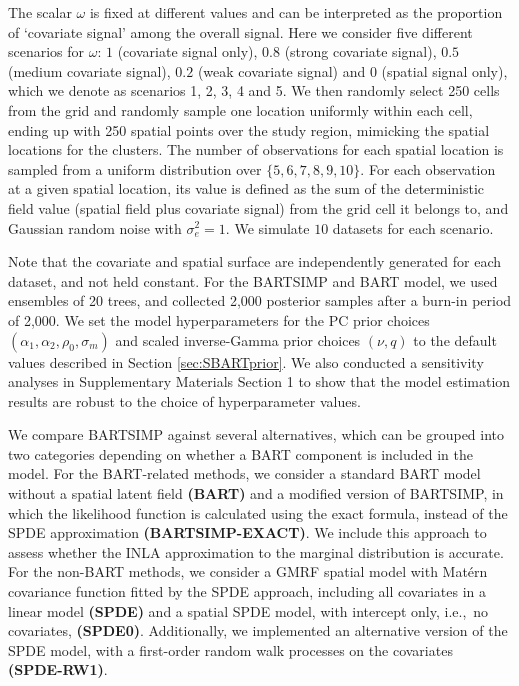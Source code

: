 \documentclass[preprint,12pt,authoryear]{elsarticle}
\begin{document}
{{}
The scalar $\omega$ is fixed at different values and can be interpreted as the proportion of `covariate signal' among the overall signal. Here we consider five different scenarios for $\omega$: $1$ (covariate signal only), $0.8$ (strong covariate signal), $0.5$ (medium covariate signal), $0.2$ (weak covariate signal) and $0$ (spatial signal only), which we denote as scenarios 1, 2, 3, 4 and 5. We then randomly select 250 cells from the grid and randomly sample one location uniformly within each cell, ending up with 250 spatial points over the study region, mimicking the spatial locations for the clusters. The number of observations for each spatial location is sampled from a uniform distribution over $\{5,6,7,8,9,10\}$. For each observation at a given spatial location, its value is defined as the sum of the deterministic field value (spatial field plus covariate signal)  from the grid cell it belongs to, and Gaussian random noise with $\sigma_e^2 = 1$. We simulate $10$ datasets for each scenario. {Note that the covariate and spatial surface are independently generated for each dataset, and not held constant. For the BARTSIMP and BART model, we used {ensembles of 20 trees, and collected 2,000 posterior samples after a burn-in period of 2,000.}  We set the model hyperparameters for the PC prior choices $(\alpha_1, \alpha_2, \rho_0, \sigma_m)$ and scaled inverse-Gamma prior choices $(\nu, q)$ to the default values described in Section \ref{sec:SBARTprior}. We also conducted a sensitivity analyses in Supplementary Materials Section 1 to show that the model estimation results are robust to the choice of hyperparameter values.

We compare BARTSIMP against several alternatives, which can be grouped into two categories depending on whether a BART component is included in the model. For the BART-related methods, we consider a standard BART model without a spatial latent field \textbf{(BART)} and a modified version of BARTSIMP, in which the likelihood function is calculated using the exact formula, instead of the SPDE approximation \textbf{(BARTSIMP-EXACT)}. We include this approach to assess whether the INLA approximation to the marginal distribution is accurate. For the non-BART methods, we consider a GMRF spatial model with Mat\'ern covariance function fitted by the SPDE approach, including all covariates in a linear model \textbf{(SPDE)} and a spatial SPDE model, with intercept only, i.e.,~no covariates, \textbf{(SPDE0)}. Additionally, we implemented an alternative version of the SPDE model, with a first-order random walk processes on the covariates \textbf{(SPDE-RW1)}.}  %




}
\end{document}
